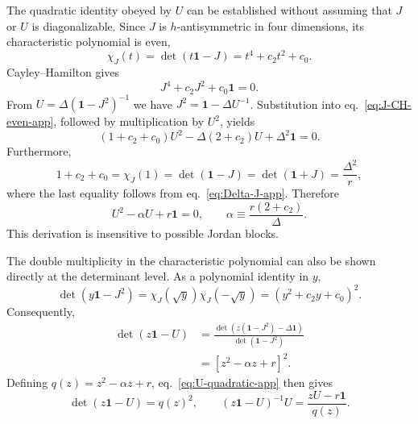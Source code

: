 \documentclass[a4paper,11pt]{article}
\numberwithin{equation}{section}
\newcommand{\Id}{\mathbf 1}
\begin{document}
The quadratic identity obeyed by $U$ can be established without assuming that $J$ or $U$ is diagonalizable. Since $J$ is $h$-antisymmetric in four dimensions, its characteristic polynomial is even,
\begin{equation}
 \chi_J(t)=\det(t\Id-J)=t^4+c_2t^2+c_0.
 \label{eq:J-even-char-app}
\end{equation}
Cayley--Hamilton gives
\begin{equation}
 J^4+c_2J^2+c_0\Id=0.
 \label{eq:J-CH-even-app}
\end{equation}
From $U=\Delta(\Id-J^2)^{-1}$ we have $J^2=\Id-\Delta U^{-1}$. Substitution into eq.~\eqref{eq:J-CH-even-app}, followed by multiplication by $U^2$, yields
\begin{equation}
 (1+c_2+c_0)U^2-\Delta(2+c_2)U+\Delta^2\Id=0.
 \label{eq:U-quadratic-pre-app}
\end{equation}
Furthermore,
\begin{equation}
 1+c_2+c_0=\chi_J(1)=\det(\Id-J)=\det(\Id+J)=\frac{\Delta^2}{r},
 \label{eq:J-char-at-one-app}
\end{equation}
where the last equality follows from eq.~\eqref{eq:Delta-J-app}. Therefore
\begin{equation}
 U^2-\alpha U+r\Id=0,
 \qquad
 \alpha\equiv\frac{r(2+c_2)}{\Delta}.
 \label{eq:U-quadratic-app}
\end{equation}
This derivation is insensitive to possible Jordan blocks.

The double multiplicity in the characteristic polynomial can also be shown directly at the determinant level. As a polynomial identity in $y$,
\begin{equation}
 \det(y\Id-J^2)
 =\chi_J(\sqrt y)\chi_J(-\sqrt y)
 =\left(y^2+c_2y+c_0\right)^2.
 \label{eq:J2-char-square-app}
\end{equation}
Consequently,
\begin{align}
 \det(z\Id-U)
 &=\frac{\det\!\left(z(\Id-J^2)-\Delta\Id\right)}{\det(\Id-J^2)}\nonumber\\
 &=\left[z^2-\alpha z+r\right]^2.
 \label{eq:U-char-square-app}
\end{align}
Defining $q(z)=z^2-\alpha z+r$, eq.~\eqref{eq:U-quadratic-app} then gives
\begin{equation}
 \det(z\Id-U)=q(z)^2,
 \qquad
 (z\Id-U)^{-1}U=\frac{zU-r\Id}{q(z)}.
 \label{eq:U-resolvent-app}
\end{equation}
\end{document}
